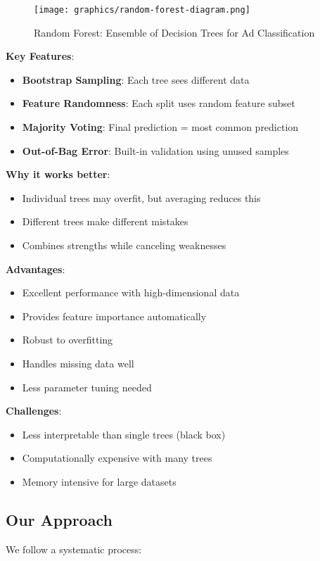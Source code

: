 \begin{figure}[h]
\centering
\texttt{[image: graphics/random-forest-diagram.png]}
\caption{Random Forest: Ensemble of Decision Trees for Ad Classification}
\vspace{1cm}
\end{figure}

\textbf{Key Features}:
\begin{itemize}
    \item \textbf{Bootstrap Sampling}: Each tree sees different data
    \item \textbf{Feature Randomness}: Each split uses random feature subset
    \item \textbf{Majority Voting}: Final prediction = most common prediction
    \item \textbf{Out-of-Bag Error}: Built-in validation using unused samples
\end{itemize}

\textbf{Why it works better}:
\begin{itemize}
    \item Individual trees may overfit, but averaging reduces this
    \item Different trees make different mistakes
    \item Combines strengths while canceling weaknesses
\end{itemize}

\textbf{Advantages}:
\begin{itemize}
    \item Excellent performance with high-dimensional data
    \item Provides feature importance automatically
    \item Robust to overfitting
    \item Handles missing data well
    \item Less parameter tuning needed
\end{itemize}

\textbf{Challenges}:
\begin{itemize}
    \item Less interpretable than single trees (black box)
    \item Computationally expensive with many trees
    \item Memory intensive for large datasets
\end{itemize}

\subsection{Our Approach}
We follow a systematic process:

